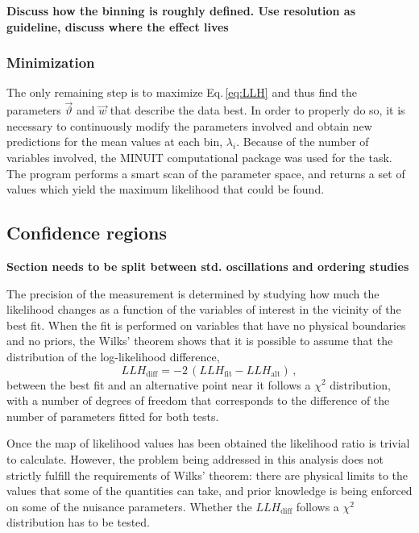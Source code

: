 \documentclass[../Main.tex]{subfiles}
\begin{document}
\textbf{Discuss how the binning is roughly defined. Use resolution as guideline, discuss where the effect lives}

\subsubsection{Minimization}
The only remaining step is to maximize Eq.\,\ref{eq:LLH} and thus find the parameters $\vec{\vartheta}$ and $\vec{w}$ that describe the data best. In order to properly do so, it is necessary to continuously modify the parameters involved and obtain new predictions for the mean values at each bin, $\lambda_i$. Because of the number of variables involved, the MINUIT computational package \cite{minuit} was used for the task. The program performs a smart scan of the parameter space, and returns a set of values which yield the maximum likelihood that could be found. 

\subsection{Confidence regions}

\textbf{Section needs to be split between std. oscillations and ordering studies}

The precision of the measurement is determined by studying how much the likelihood changes as a function of the variables of interest in the vicinity of the best fit. When the fit is performed on variables that have no physical boundaries and no priors, the Wilks' theorem \cite{wilks} shows that it is possible to assume that the distribution of the log-likelihood difference,
\begin{equation}
LLH_\mathrm{diff} = -2\,\left(LLH_\mathrm{fit} - LLH_\mathrm{alt}\right)\,,
\end{equation}
 between the best fit and an alternative point near it follows a $\chi^2$ distribution, with a number of degrees of freedom that corresponds to the difference of the number of parameters fitted for both tests.

Once the map of likelihood values has been obtained the likelihood ratio is trivial to calculate. However, the problem being addressed in this analysis does not strictly fulfill the requirements of Wilks' theorem: there are physical limits to the values that some of the quantities can take, and prior knowledge is being enforced on some of the nuisance parameters. Whether the $LLH_\mathrm{diff}$ follows a $\chi^2$ distribution has to be tested.
\end{document}
